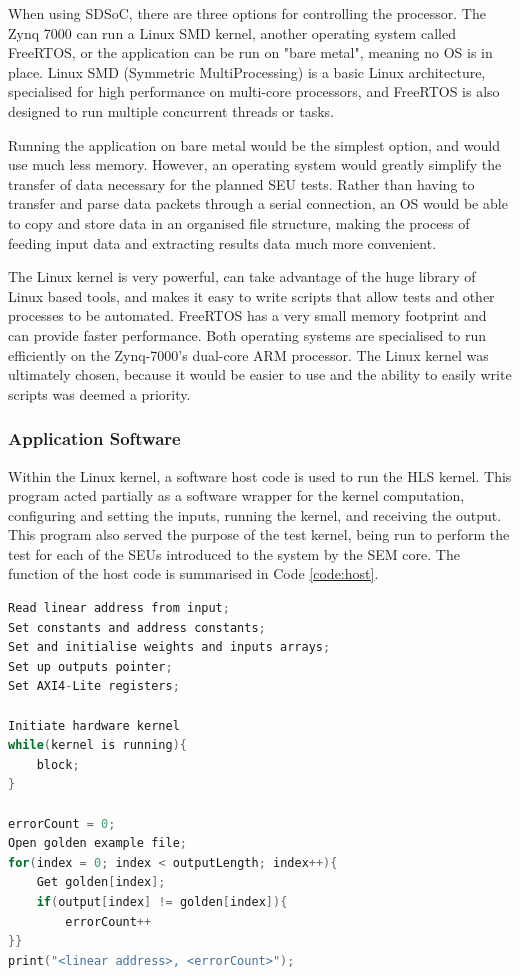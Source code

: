 \documentclass[12pt]{article}
\begin{document}
When using SDSoC, there are three options for controlling the processor. The Zynq 7000 can run a Linux SMD kernel, another operating system called FreeRTOS, or the application can be run on "bare metal", meaning no OS is in place. Linux SMD (Symmetric MultiProcessing) is a basic Linux architecture, specialised for high performance on multi-core processors, and FreeRTOS is also designed to run multiple concurrent threads or tasks.

Running the application on bare metal would be the simplest option, and would use much less memory. However, an operating system would greatly simplify the transfer of data necessary for the planned SEU tests. Rather than having to transfer and parse data packets through a serial connection, an OS would be able to copy and store data in an organised file structure, making the process of feeding input data and extracting results data much more convenient.

The Linux kernel is very powerful, can take advantage of the huge library of Linux based tools, and makes it easy to write scripts that allow tests and other processes to be automated. FreeRTOS has a very small memory footprint and can provide faster performance. Both operating systems are specialised to run efficiently on the Zynq-7000's dual-core ARM processor. The Linux kernel was ultimately chosen, because it would be easier to use and the ability to easily write scripts was deemed a priority.

\subsubsection{Application Software}
\label{sec:Design-PS-SW}

Within the Linux kernel, a software host code is used to run the HLS kernel. This program acted partially as a software wrapper for the kernel computation, configuring  and setting the inputs, running the kernel, and receiving the output. This program also served the purpose of the test kernel, being run to perform the test for each of the SEUs introduced to the system by the SEM core. The function of the host code is summarised in Code \ref{code:host}.

\begin{lstlisting}[caption=Host code for the hardware kernel, label=code:host, language=C,deletekeywords={register}]
Read linear address from input;
Set constants and address constants;
Set and initialise weights and inputs arrays;
Set up outputs pointer;
Set AXI4-Lite registers;

Initiate hardware kernel
while(kernel is running){
	block;
}

errorCount = 0;
Open golden example file;
for(index = 0; index < outputLength; index++){
	Get golden[index];
	if(output[index] != golden[index]){
		errorCount++
}}
print("<linear address>, <errorCount>");
\end{lstlisting}
\end{document}
